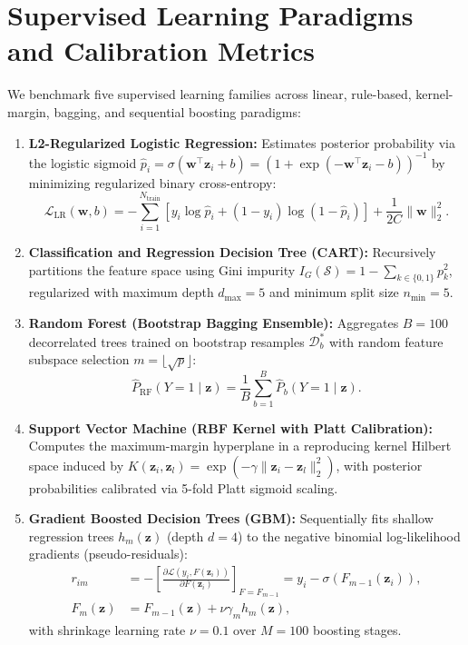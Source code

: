 \documentclass[12pt,a4paper]{report}
\begin{document}
\section{Supervised Learning Paradigms and Calibration Metrics}
We benchmark five supervised learning families across linear, rule-based, kernel-margin, bagging, and sequential boosting paradigms:
\begin{enumerate}
    \item \textbf{L2-Regularized Logistic Regression:} Estimates posterior probability via the logistic sigmoid $\hat{p}_i = \sigma(\bm{w}^\top \bm{z}_i + b) = (1 + \exp(-\bm{w}^\top \bm{z}_i - b))^{-1}$ by minimizing regularized binary cross-entropy:
    \begin{equation}
        \mathcal{L}_{\text{LR}}(\bm{w}, b) = -\sum_{i=1}^{N_{\text{train}}} \left[ y_i \log \hat{p}_i + (1 - y_i) \log(1 - \hat{p}_i) \right] + \frac{1}{2C} \|\bm{w}\|_2^2.
    \end{equation}
    \item \textbf{Classification and Regression Decision Tree (CART):} Recursively partitions the feature space using Gini impurity $I_G(\mathcal{S}) = 1 - \sum_{k \in \{0,1\}} p_k^2$, regularized with maximum depth $d_{\max} = 5$ and minimum split size $n_{\min} = 5$.
    \item \textbf{Random Forest (Bootstrap Bagging Ensemble):} Aggregates $B = 100$ decorrelated trees trained on bootstrap resamples $\mathcal{D}_b^*$ with random feature subspace selection $m = \lfloor\sqrt{p}\rfloor$:
    \begin{equation}
        \hat{P}_{\text{RF}}(Y=1 \mid \bm{z}) = \frac{1}{B} \sum_{b=1}^B \hat{P}_b(Y=1 \mid \bm{z}).
    \end{equation}
    \item \textbf{Support Vector Machine (RBF Kernel with Platt Calibration):} Computes the maximum-margin hyperplane in a reproducing kernel Hilbert space induced by $K(\bm{z}_i, \bm{z}_l) = \exp(-\gamma \|\bm{z}_i - \bm{z}_l\|_2^2)$, with posterior probabilities calibrated via 5-fold Platt sigmoid scaling.
    \item \textbf{Gradient Boosted Decision Trees (GBM):} Sequentially fits shallow regression trees $h_m(\bm{z})$ (depth $d=4$) to the negative binomial log-likelihood gradients (pseudo-residuals):
    \begin{align}
        r_{im} &= -\left[ \frac{\partial \mathcal{L}(y_i, F(\bm{z}_i))}{\partial F(\bm{z}_i)} \right]_{F = F_{m-1}} = y_i - \sigma\left(F_{m-1}(\bm{z}_i)\right), \\
        F_m(\bm{z}) &= F_{m-1}(\bm{z}) + \nu \gamma_m h_m(\bm{z}),
    \end{align}
    with shrinkage learning rate $\nu = 0.1$ over $M = 100$ boosting stages.
\end{enumerate}
\end{document}
